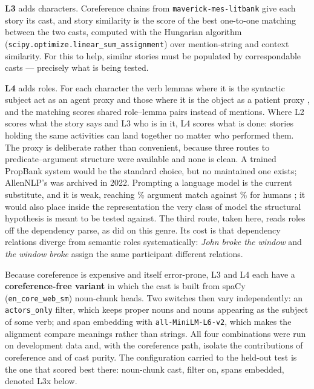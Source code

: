 \documentclass[11pt,letterpaper,twocolumn]{article}
\begin{document}
\textbf{L3} adds characters. Coreference chains from
\texttt{maverick-mes-litbank} \citep{maverick,jm3} give each story its cast, and
story similarity is the score of the best one-to-one matching between the two
casts, computed with the Hungarian algorithm
(\texttt{scipy.optimize.linear\_sum\_assignment}) over mention-string and
context similarity. For this to help, similar stories must be populated by
correspondable casts --- precisely what is being tested.

\textbf{L4} adds roles. For each character the verb lemmas where it is the
syntactic subject act as an agent proxy and those where it is the object as a
patient proxy \citep[Ch.~22]{jm3}, and the matching scores shared role--lemma
pairs instead of mentions. Where L2 scores what the story says and L3 who is in
it, L4 scores what is done: stories holding the same activities can land
together no matter who performed them. The proxy is deliberate rather than convenient, because three routes to
predicate--argument structure were available and none is clean. A trained
PropBank system would be the standard choice, but no maintained one exists;
AllenNLP's was archived in 2022. Prompting a language model is the current
substitute, and it is weak, reaching \SrlArgMatchLLM\% argument match against
\SrlArgMatchHuman\% for humans \citep{bonn2024}; it would also place inside the
representation the very class of model the structural hypothesis is meant to be
tested against. The third route, taken here, reads roles off the dependency
parse, as \citet{chaturvedi2018} did on this genre. Its cost is that
dependency relations diverge from semantic roles systematically: \emph{John broke the window} and \emph{the window broke} assign
the same participant different relations.

Because coreference is expensive and itself error-prone, L3 and L4 each have a
\textbf{coreference-free variant} in which the cast is built from spaCy
(\texttt{en\_core\_web\_sm}) noun-chunk heads. Two switches then vary
independently: an \texttt{actors\_only} filter, which keeps proper nouns and
nouns appearing as the subject of some verb; and span embedding with
\texttt{all-MiniLM-L6-v2}, which makes the alignment compare meanings rather
than strings. All four combinations were run on development data and, with the
coreference path, isolate the contributions of coreference and of cast purity.
The configuration carried to the held-out test is the one that scored best
there: noun-chunk cast, filter on, spans embedded, denoted L3x below.
\end{document}
